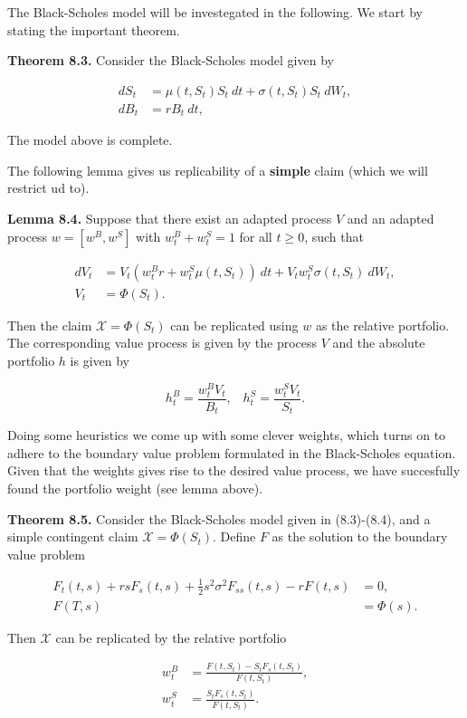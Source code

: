 \documentclass[
]{article}
\begin{document}
The Black-Scholes model will be investegated in the following. We start
by stating the important theorem.

\textbf{Theorem 8.3.} Consider the Black-Scholes model given by

\begin{align*}
dS_t&=\mu(t,S_t) S_t\ dt+\sigma(t,S_t) S_t\ dW_t,\tag{8.2}\\
dB_t&=r B_t\ dt,\tag{8.3}
\end{align*}

The model above is complete.

The following lemma gives us replicability of a \textbf{simple} claim
(which we will restrict ud to).

\textbf{Lemma 8.4.} Suppose that there exist an adapted process \(V\)
and an adapted process \(w=[w^B,w^S]\) with \(w^B_t+w^S_t=1\) for all
\(t\ge 0\), such that

\begin{align*}
dV_t&=V_t(w_t^Br+w_t^S\mu(t,S_t))\ dt+V_tw_t^S\sigma(t,S_t)\ dW_t,\\
V_t&=\Phi(S_t).
\end{align*}

Then the claim \(\mathcal{X}=\Phi(S_t)\) can be replicated using \(w\)
as the relative portfolio. The corresponding value process is given by
the process \(V\) and the absolute portfolio \(h\) is given by

\[
h_t^B=\frac{w_t^B V_t}{B_t},\hspace{10pt} h_t^S=\frac{w_t^S V_t}{S_t}.
\]

Doing some heuristics we come up with some clever weights, which turns
on to adhere to the boundary value problem formulated in the
Black-Scholes equation. Given that the weights gives rise to the desired
value process, we have succesfully found the portfolio weight (see lemma
above).

\textbf{Theorem 8.5.} Consider the Black-Scholes model given in
(8.3)-(8.4), and a simple contingent claim \(\mathcal{X}=\Phi(S_t)\).
Define \(F\) as the solution to the boundary value problem

\begin{align*}
F_t(t,s)+rsF_s(t,s)+\frac{1}{2}s^2\sigma^2F_{ss}(t,s)-rF(t,s)&=0,\\
F(T,s)&=\Phi(s).
\end{align*}

Then \(\mathcal{X}\) can be replicated by the relative portfolio

\begin{align*}
w_t^B&=\frac{F(t,S_t)-S_tF_s(t,S_t)}{F(t,S_t)},\\
w_t^S&=\frac{S_tF_s(t,S_t)}{F(t,S_t)}.
\end{align*}
\end{document}
